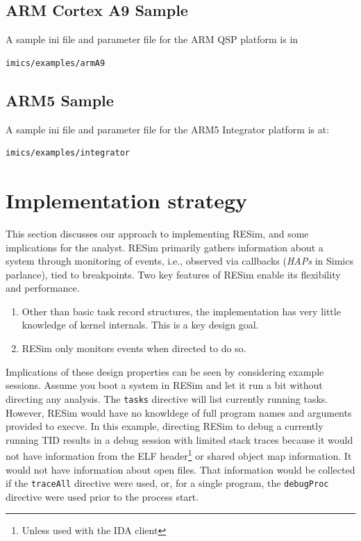 \documentclass[titlepage]{article}
\begin{document}
\subsection{ARM Cortex A9 Sample}
A sample ini file and parameter file for the ARM QSP platform is in 
\begin{verbatim}
imics/examples/armA9
\end{verbatim}

\subsection{ARM5 Sample}
A sample ini file and parameter file for the ARM5 Integrator platform is at:
\begin{verbatim}
imics/examples/integrator
\end{verbatim}


\section{Implementation strategy}
\label{implementation}
This section discusses our approach to implementing RESim, and some implications for the analyst.
RESim primarily gathers information about a system through monitoring of events, i.e., observed via callbacks (\textit{HAPs} in Simics parlance), tied to 
breakpoints.  Two key features of RESim enable its flexibility and performance.  

\begin{enumerate}
\item Other than basic task record structures, the implementation has very little knowledge of kernel internals.
This is a key design goal.  
\item RESim only monitors events when directed to do so.
\end{enumerate}
\noindent Implications of these design properties can be seen by considering example sessions.  Assume you boot a system in RESim and let it run a bit without
directing any analysis.  The {\tt tasks} directive will list currently running tasks.  However, RESim would have no knowldege of full program names and arguments
provided to execve.  In this example, directing RESim to debug a currently running TID results in a debug session with limited stack traces because
it would not have information from the ELF header\footnote{Unless used with the IDA client}  or shared object map information.  It would not have
information about open files.
That information would be collected if the {\tt traceAll} directive were used, or, for a single program, the {\tt debugProc} directive were used prior to the
process start.
\end{document}
